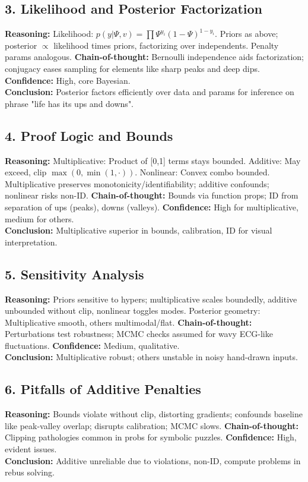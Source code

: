 \documentclass{article}
\begin{document}
\subsection{3. Likelihood and Posterior Factorization}
\textbf{Reasoning:} Likelihood: \(p(y|\Psi,v) = \prod \Psi^{y_i} (1-\Psi)^{1-y_i}\). Priors as above; posterior \(\propto\) likelihood times priors, factorizing over independents. Penalty params analogous. \textbf{Chain-of-thought:} Bernoulli independence aids factorization; conjugacy eases sampling for elements like sharp peaks and deep dips. \textbf{Confidence:} High, core Bayesian.\\
\textbf{Conclusion:} Posterior factors efficiently over data and params for inference on phrase "life has its ups and downs".

\subsection{4. Proof Logic and Bounds}
\textbf{Reasoning:} Multiplicative: Product of [0,1] terms stays bounded. Additive: May exceed, clip \(\max(0,\min(1,\cdot))\). Nonlinear: Convex combo bounded. Multiplicative preserves monotonicity/identifiability; additive confounds; nonlinear risks non-ID. \textbf{Chain-of-thought:} Bounds via function props; ID from separation of ups (peaks), downs (valleys). \textbf{Confidence:} High for multiplicative, medium for others.\\
\textbf{Conclusion:} Multiplicative superior in bounds, calibration, ID for visual interpretation.

\subsection{5. Sensitivity Analysis}
\textbf{Reasoning:} Priors sensitive to hypers; multiplicative scales boundedly, additive unbounded without clip, nonlinear toggles modes. Posterior geometry: Multiplicative smooth, others multimodal/flat. \textbf{Chain-of-thought:} Perturbations test robustness; MCMC checks assumed for wavy ECG-like fluctuations. \textbf{Confidence:} Medium, qualitative.\\
\textbf{Conclusion:} Multiplicative robust; others unstable in noisy hand-drawn inputs.

\subsection{6. Pitfalls of Additive Penalties}
\textbf{Reasoning:} Bounds violate without clip, distorting gradients; confounds baseline like peak-valley overlap; disrupts calibration; MCMC slows. \textbf{Chain-of-thought:} Clipping pathologies common in probs for symbolic puzzles. \textbf{Confidence:} High, evident issues.\\
\textbf{Conclusion:} Additive unreliable due to violations, non-ID, compute problems in rebus solving.
\end{document}

